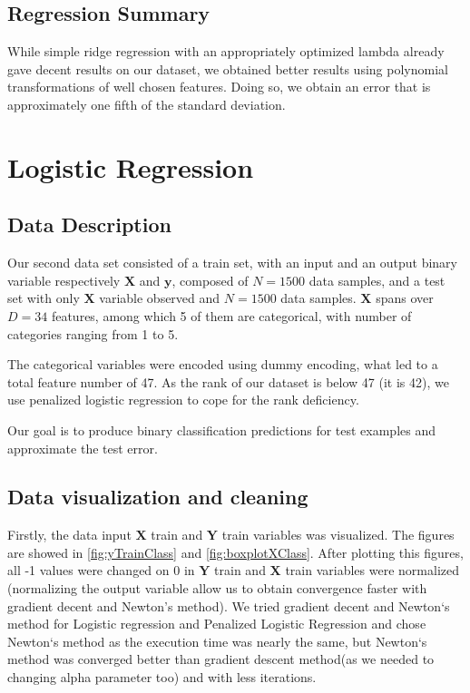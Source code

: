 \documentclass{article} %
\begin{document}
\subsection{Regression Summary}
While simple ridge regression with an appropriately optimized lambda already
gave decent results on our dataset, we obtained better results using polynomial
transformations of well chosen features. Doing so, we obtain an error that is
approximately one fifth of the standard deviation.

\section{Logistic Regression}
\subsection{Data Description}
Our second data set consisted of a train set, with an input and an output binary
variable respectively $\mathbf{X}$ and $\mathbf{y}$, composed of $N=1500$ data
samples, and a test set with only $\mathbf{X}$ variable observed and $N=1500$
data samples. $\mathbf{X}$ spans over $D=34$ features, among which 5 of them are
categorical, with number of categories ranging from 1 to 5.

The categorical variables were encoded using dummy encoding, what led to a total
feature number of 47. As the rank of our dataset is below 47 (it is 42), we use penalized logistic regression to cope for the rank deficiency.

Our goal is to produce binary classification predictions for test examples and approximate the test error.

\subsection{Data visualization and cleaning}
Firstly, the data input $\mathbf{X}$ train and $\mathbf{Y}$ train variables was visualized. The figures are showed in \ref{fig:yTrainClass} and \ref{fig:boxplotXClass}. After plotting this figures, all -1 values were changed on 0 in $\mathbf{Y}$ train and $\mathbf{X}$ train variables were normalized (normalizing the output variable allow us to obtain convergence faster with gradient decent and Newton's method). We tried gradient decent and Newton`s method for Logistic regression and Penalized Logistic Regression  and chose Newton`s method as the execution time was nearly the same, but Newton`s method was converged better than gradient descent method(as we needed to changing alpha parameter too) and with less iterations.
\end{document}
